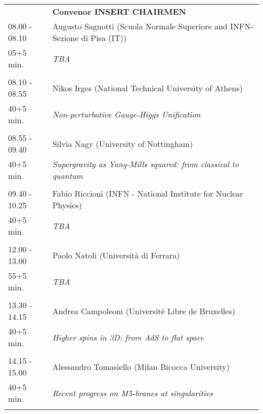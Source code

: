 \begin{longtable}{p{3cm}p{13cm}}
&\hfill {\bf Convenor INSERT CHAIRMEN }\\ 
08.00 - 08.10 & Augusto Sagnotti (Scuola Normale Superiore and INFN-Sezione di Pisa (IT))\\ 
05+5 min. & {\it TBA}\\ 
 & \\ 
08.10 - 08.55 & Nikos Irges (National Technical University of Athens)\\ 
40+5 min. & {\it Non-perturbative Gauge-Higgs Unification}\\ 
 & \\ 
08.55 - 09.40 & Silvia Nagy (University of Nottingham)\\ 
40+5 min. & {\it Supergravity as Yang-Mills squared: from classical to quantum}\\ 
 & \\ 
09.40 - 10.25 & Fabio Riccioni (INFN - National Institute for Nuclear Physics)\\ 
40+5 min. & {\it TBA}\\ 
 & \\ 
12.00 - 13.00 & Paolo Natoli (Università di Ferrara)\\ 
55+5 min. & {\it TBA}\\ 
 & \\ 
13.30 - 14.15 & Andrea Campoleoni (Université Libre de Bruxelles)\\ 
40+5 min. & {\it Higher spins in 3D: from AdS to flat space}\\ 
 & \\ 
14.15 - 15.00 & Alessandro Tomasiello (Milan Bicocca University)\\ 
40+5 min. & {\it Recent progress on M5-branes at singularities}\\ 
 & \\ 
\end{longtable}

